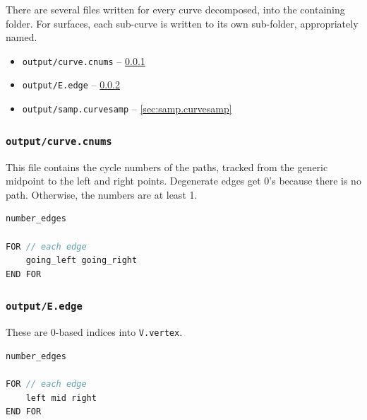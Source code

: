 There are several files written for every curve decomposed, into the containing folder.  For surfaces, each sub-curve is written to its own sub-folder, appropriately named.

\begin{itemize}
	\item {\tt output/curve.cnums} -- \ref{sec:curve.cnums}
	\item {\tt output/E.edge} -- \ref{sec:e.edge}
	\item {\tt output/samp.curvesamp} -- \ref{sec:samp.curvesamp}
\end{itemize}


\subsubsection{\tt output/curve.cnums}
\label{sec:curve.cnums}


This file contains the cycle numbers of the paths, tracked from the generic midpoint to the left and right points.  Degenerate edges get 0's because there is no path.  Otherwise, the numbers are at least 1.

\begin{center}\begin{minipage}{0.9\linewidth}
\begin{lstlisting}[language=c++, caption={\tt output/curve.cnums}, captionpos=b]
number_edges

FOR // each edge
	going_left going_right
END FOR
\end{lstlisting}
\end{minipage}\end{center}



\subsubsection{\tt output/E.edge}
\label{sec:e.edge}

These are 0-based indices into {\tt V.vertex}.

\begin{center}\begin{minipage}{0.9\linewidth}
\begin{lstlisting}[language=c++, caption={\tt output/E.edge}, captionpos=b]
number_edges

FOR // each edge
	left mid right
END FOR
\end{lstlisting}
\end{minipage}\end{center}






